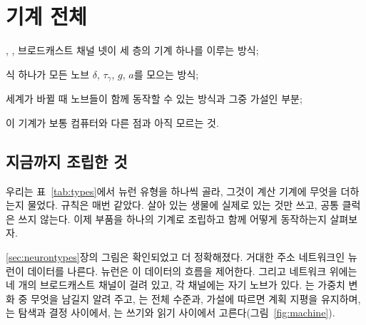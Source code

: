 \chapter{기계 전체}
\label{sec:synthesis}
\begin{chaptergoals}
\item {}, , 브로드캐스트 채널 넷이 세 층의 기계 하나를 이루는 방식;
\item 식 하나가 모든 노브 $\delta$, $\tau_\gamma$, $g$, $a$를 모으는 방식;
\item 세계가 바뀔 때 노브들이 함께 동작할 수 있는 방식과 그중 가설인 부분;
\item 이 기계가 보통 컴퓨터와 다른 점과 아직 모르는 것.
\end{chaptergoals}

\section{지금까지 조립한 것}

우리는 표~\ref{tab:types}에서 뉴런 유형을 하나씩 골라, 그것이 계산 기계에 무엇을 더하는지 물었다. 규칙은 매번 같았다. 살아 있는 생물에 실제로 있는 것만 쓰고, 공통 클럭은 쓰지 않는다. 이제 부품을 하나의 기계로 조립하고 함께 어떻게 동작하는지 살펴보자.

\ref{sec:neurontypes}장의 그림은 확인되었고 더 정확해졌다. 거대한 주소 네트워크인  뉴런이 데이터를 나른다.  뉴런은 이 데이터의 흐름을 제어한다. 그리고 네트워크 위에는 네 개의 브로드캐스트 채널이 걸려 있고, 각 채널에는 자기 노브가 있다. 는 가중치 변화 중 무엇을 남길지 알려 주고, 는 전체 수준과, 가설에 따르면 계획 지평을 유지하며, 는 탐색과 결정 사이에서, 는 쓰기와 읽기 사이에서 고른다(그림~\ref{fig:machine}).

